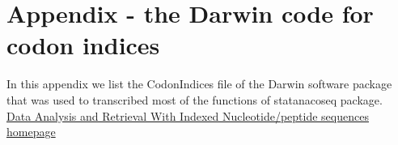 \appendix
\chapter{Appendix - the Darwin code for codon indices}
In this appendix we list the CodonIndices file of the Darwin software package that was used to transcribed most of the functions of statanacoseq package. \\
\href{http://www.cbrg.ethz.ch/darwin}{ Data Analysis and Retrieval With Indexed Nucleotide/peptide sequences homepage} \\

  
